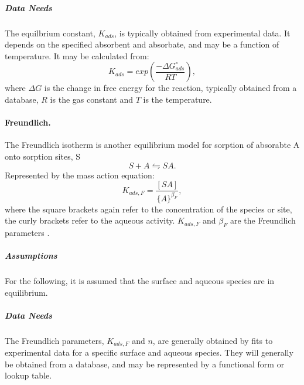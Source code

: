 \subparagraph{Data Needs} 
The equilbrium constant, $K_{ads}$, is typically obtained from experimental data. 
It depends on the specified absorbent and absorbate, and may be a function of temperature. 
It may be calculated from:
\begin{equation}
  K_{ads} = exp\left(\frac{-\Delta G^{\circ}_{ads}}{RT}\right),
\end{equation}
where $\Delta G$ is the change in free energy for the reaction,
typically obtained from a database, $R$ is the gas constant and $T$ is the temperature.

\paragraph{Freundlich.} 
The Freundlich isotherm is another equilibrium model for sorption of absorabte A onto sorption sites, S
\begin{equation}  \label{eq:langmuir_reaction} 
  S + A \leftrightharpoons SA.
\end{equation}
Represented by the mass action equation:
\begin{equation}
  K_{ads,F} = \frac{ [ SA ] }{ \{A\}^{\beta_F} },
\end{equation}
where the square brackets again refer to the concentration of the
species or site, the curly brackets refer to the aqueous activity.
$K_{ads,F}$ and ${\beta_F}$ are the Freundlich parameters
\citep[e.g.][]{langmuir-1997, stumm-1992}.

\subparagraph{Assumptions} 
For the following, it is assumed that the surface and aqueous species are in equilibrium.

\subparagraph{Data Needs} 
The Freundlich parameters, $K_{ads,F}$ and $n$, are generally obtained by fits to experimental data 
for a specific surface and aqueous species. 
They will generally be obtained from a database, and 
may be represented by a functional form or lookup table.

